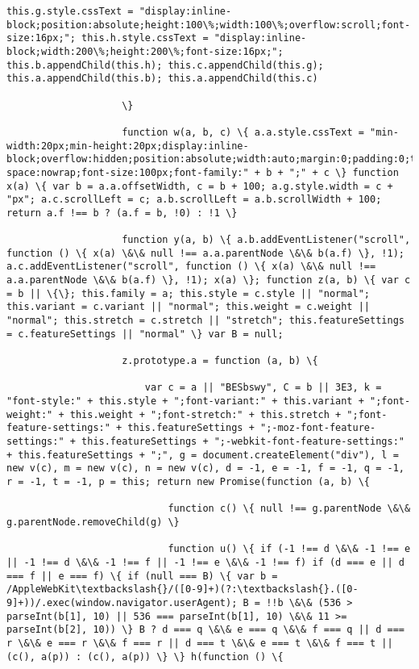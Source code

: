 \documentclass[11pt]{article}
\begin{document}
\begin{Verbatim}[commandchars=\\\{\}]
                        this.g.style.cssText = "display:inline-block;position:absolute;height:100\%;width:100\%;overflow:scroll;font-size:16px;"; this.h.style.cssText = "display:inline-block;width:200\%;height:200\%;font-size:16px;"; this.b.appendChild(this.h); this.c.appendChild(this.g); this.a.appendChild(this.b); this.a.appendChild(this.c)

                    \}

                    function w(a, b, c) \{ a.a.style.cssText = "min-width:20px;min-height:20px;display:inline-block;overflow:hidden;position:absolute;width:auto;margin:0;padding:0;top:-999px;left:-999px;white-space:nowrap;font-size:100px;font-family:" + b + ";" + c \} function x(a) \{ var b = a.a.offsetWidth, c = b + 100; a.g.style.width = c + "px"; a.c.scrollLeft = c; a.b.scrollLeft = a.b.scrollWidth + 100; return a.f !== b ? (a.f = b, !0) : !1 \}

                    function y(a, b) \{ a.b.addEventListener("scroll", function () \{ x(a) \&\& null !== a.a.parentNode \&\& b(a.f) \}, !1); a.c.addEventListener("scroll", function () \{ x(a) \&\& null !== a.a.parentNode \&\& b(a.f) \}, !1); x(a) \}; function z(a, b) \{ var c = b || \{\}; this.family = a; this.style = c.style || "normal"; this.variant = c.variant || "normal"; this.weight = c.weight || "normal"; this.stretch = c.stretch || "stretch"; this.featureSettings = c.featureSettings || "normal" \} var B = null;

                    z.prototype.a = function (a, b) \{

                        var c = a || "BESbswy", C = b || 3E3, k = "font-style:" + this.style + ";font-variant:" + this.variant + ";font-weight:" + this.weight + ";font-stretch:" + this.stretch + ";font-feature-settings:" + this.featureSettings + ";-moz-font-feature-settings:" + this.featureSettings + ";-webkit-font-feature-settings:" + this.featureSettings + ";", g = document.createElement("div"), l = new v(c), m = new v(c), n = new v(c), d = -1, e = -1, f = -1, q = -1, r = -1, t = -1, p = this; return new Promise(function (a, b) \{

                            function c() \{ null !== g.parentNode \&\& g.parentNode.removeChild(g) \}

                            function u() \{ if (-1 !== d \&\& -1 !== e || -1 !== d \&\& -1 !== f || -1 !== e \&\& -1 !== f) if (d === e || d === f || e === f) \{ if (null === B) \{ var b = /AppleWebKit\textbackslash{}/([0-9]+)(?:\textbackslash{}.([0-9]+))/.exec(window.navigator.userAgent); B = !!b \&\& (536 > parseInt(b[1], 10) || 536 === parseInt(b[1], 10) \&\& 11 >= parseInt(b[2], 10)) \} B ? d === q \&\& e === q \&\& f === q || d === r \&\& e === r \&\& f === r || d === t \&\& e === t \&\& f === t || (c(), a(p)) : (c(), a(p)) \} \} h(function () \{


\end{Verbatim}
\end{document}
